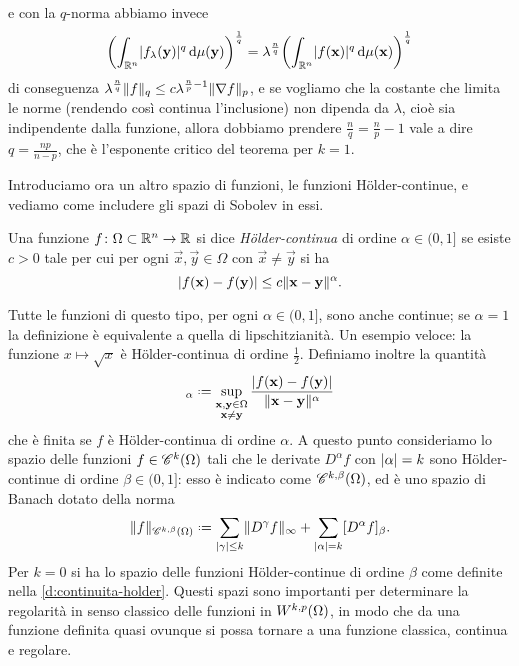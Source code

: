 e con la $q$-norma abbiamo invece
\begin{equation}
    \biggl(\int_{\R^n}\abs{f_\lambda(\vec y)}^q\,\dd\mu(\vec y)\biggr)^\frac1{q}=
    \lambda^\frac{n}{q}\biggl(\int_{\R^n}\abs{f(\vec x)}^q\,\dd\mu(\vec x)\biggr)^\frac1{q}
\end{equation}
di conseguenza $\lambda^\frac{n}{q}\norm{f}_q\le c\lambda^{\frac{n}{p}-1}\norm{\grad f}_p$, e se vogliamo che la costante che limita le norme (rendendo cos\`i continua l'inclusione) non dipenda da $\lambda$, cioè sia indipendente dalla funzione, allora dobbiamo prendere $\frac{n}{q}=\frac{n}{p}-1$ vale a dire $q=\frac{np}{n-p}$, che è l'esponente critico del teorema per $k=1$.

Introduciamo ora un altro spazio di funzioni, le funzioni Hölder-continue, e vediamo come includere gli spazi di Sobolev in essi.
\begin{definizione} \label{d:continuita-holder}
    Una funzione $f\colon\Omega\subset\R^n\to\R$ si dice \emph{Hölder-continua} di ordine $\alpha\in(0,1]$ se esiste $c>0$ tale per cui per ogni $\vec x,\vec y\in\Omega$  con $\vec x\ne\vec y$ si ha
    \begin{equation}
        \abs{f(\vec x)-f(\vec y)}\le c\norm{\vec x-\vec y}^\alpha.
    \end{equation}
\end{definizione}
Tutte le funzioni di questo tipo, per ogni $\alpha\in(0,1]$, sono anche continue; se $\alpha=1$ la definizione è equivalente a quella di lipschitzianità.
Un esempio veloce: la funzione $x\mapsto\sqrt{x}$ è Hölder-continua di ordine $\frac12$.
Definiamo inoltre la quantità
\begin{equation}
    [f]_\alpha\defeq\sup_{\substack{\vec x,\vec y\in\Omega\\\vec x\ne\vec y}}\frac{\abs{f(\vec x)-f(\vec y)}}{\norm{\vec x-\vec y}^\alpha}
    \label{eq:seminorma-holder}
\end{equation}
che è finita se $f$ è Hölder-continua di ordine $\alpha$.
A questo punto consideriamo lo spazio delle funzioni $f\in\cont[k]{\Omega}$ tali che le derivate $D^\alpha f$ con $\abs{\alpha}=k$ sono Hölder-continue di ordine $\beta\in(0,1]$: esso è indicato come $\cont[k,\beta]{\Omega}$, ed è uno spazio di Banach dotato della norma
\begin{equation}
    \norm{f}_{\cont[k,\beta]{\Omega}}\defeq\sum_{\abs{\gamma}\le k}\norm{D^\gamma f}_\infty+\sum_{\abs{\alpha}=k}[D^\alpha f]_\beta.
    \label{eq:norma-spazio-holder}
\end{equation}
Per $k=0$ si ha lo spazio delle funzioni Hölder-continue di ordine $\beta$ come definite nella \ref{d:continuita-holder}.
Questi spazi sono importanti per determinare la regolarità in senso classico delle funzioni in $\sobW[k,p]{\Omega}$, in modo che da una funzione definita quasi ovunque si possa tornare a una funzione classica, continua e regolare.
